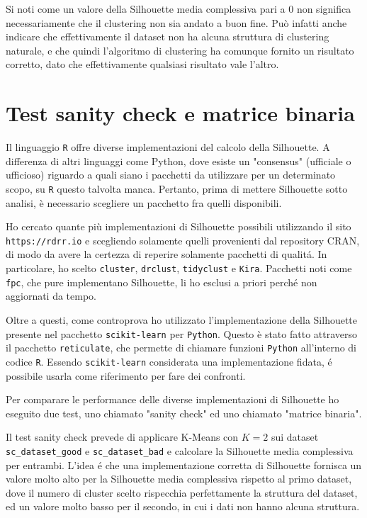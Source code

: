 \documentclass[a4paper, 12pt]{report}
\begin{document}
			Si noti come un valore della Silhouette media complessiva
			pari a $0$ non significa necessariamente che il clustering
			non sia andato a buon fine. Può infatti anche indicare che
			effettivamente il dataset non ha alcuna struttura di clustering
			naturale, e che quindi l'algoritmo di clustering ha comunque
			fornito un risultato corretto, dato che effettivamente qualsiasi
			risultato vale l'altro.

		\section{Test sanity check e matrice binaria}

			Il linguaggio \texttt{R} offre diverse implementazioni del
			calcolo della Silhouette. A differenza di altri linguaggi come
			Python, dove esiste un "consensus" (ufficiale o ufficioso) riguardo
			a quali siano i pacchetti da utilizzare per un determinato scopo,
			su \texttt{R} questo talvolta manca. Pertanto, prima di mettere
			Silhouette sotto analisi, è necessario scegliere un pacchetto fra
			quelli disponibili.

			Ho cercato quante più implementazioni di Silhouette possibili
			utilizzando il sito \texttt{https://rdrr.io} e scegliendo
			solamente quelli provenienti dal repository CRAN, di modo da
			avere la certezza di reperire solamente pacchetti di qualitá.
			In particolare, ho scelto \texttt{cluster}, \texttt{drclust},
			\texttt{tidyclust} e \texttt{Kira}. Pacchetti noti come
			\texttt{fpc}, che pure implementano Silhouette, li ho esclusi
			a priori perché non aggiornati da tempo.

			Oltre a questi, come controprova ho utilizzato l'implementazione
			della Silhouette presente nel pacchetto \texttt{scikit-learn} per
			\texttt{Python}. Questo è stato fatto attraverso il pacchetto
			\texttt{reticulate}, che permette di chiamare funzioni \texttt{Python}
			all'interno di codice \texttt{R}. Essendo \texttt{scikit-learn} 
			considerata una implementazione fidata, é possibile usarla come
			riferimento per fare dei confronti.

			Per comparare le performance delle diverse implementazioni di
			Silhouette ho eseguito due test, uno chiamato "sanity check" ed
			uno chiamato "matrice binaria".

			Il test sanity check prevede di applicare K-Means con $K = 2$
			sui dataset \texttt{sc\_dataset\_good} e \texttt{sc\_dataset\_bad}
			e calcolare la Silhouette media complessiva per entrambi. L'idea
			é che una implementazione corretta di Silhouette fornisca un
			valore molto alto per la Silhouette media complessiva rispetto
			al primo dataset, dove il numero di cluster scelto rispecchia
			perfettamente la struttura del dataset, ed un valore molto basso
			per il secondo, in cui i dati non hanno alcuna struttura.
\end{document}
